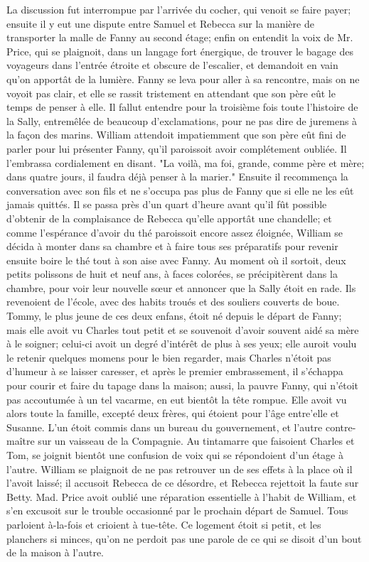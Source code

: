 La discussion fut interrompue par l'arrivée du cocher, qui venoit se faire payer; ensuite il y eut une dispute entre Samuel\setcounter{page}{386} et Rebecca sur la manière de transporter la malle de Fanny au second étage; enfin on entendit la voix de Mr. Price, qui se plaignoit, dans un langage fort énergique, de trouver le bagage des voyageurs dans l'entrée étroite et obscure de l'escalier, et demandoit en vain qu'on apportât de la lumière. Fanny se leva pour aller à sa rencontre, mais on ne voyoit pas clair, et elle se rassit tristement en attendant que son père eût le temps de penser à elle. Il fallut entendre pour la troisième fois toute l'histoire de la Sally, entremêlée de beaucoup d'exclamations, pour ne pas dire de juremens à la façon des marins. William attendoit impatiemment que son père eût fini de parler pour lui présenter Fanny, qu'il paroissoit avoir complétement oubliée. Il l'embrassa cordialement en disant. "La voilà, ma foi, grande, comme père et mère; dans quatre jours, il faudra déjà penser à la marier." Ensuite il recommença la conversation avec son fils et ne s'occupa pas plus de Fanny que si elle ne les eût jamais quittés.
Il se passa près d'un quart d'heure avant qu'il fût possible d'obtenir de la complaisance de Rebecca qu'elle apportât une chandelle; et comme l'espérance d'avoir du thé paroissoit encore assez éloignée, William se décida à monter dans\setcounter{page}{387} sa chambre et à faire tous ses préparatifs pour revenir ensuite boire le thé tout à son aise avec Fanny. Au moment où il sortoit, deux petits polissons de huit et neuf ans, à faces colorées, se précipitèrent dans la chambre, pour voir leur nouvelle sœur et annoncer que la Sally étoit en rade. Ils revenoient de l’école, avec des habits troués et des souliers couverts de boue. Tommy, le plus jeune de ces deux enfans, étoit né depuis le départ de Fanny; mais elle avoit vu Charles tout petit et se souvenoit d’avoir souvent aidé sa mère à le soigner; celui-ci avoit un degré d’intérêt de plus à ses yeux; elle auroit voulu le retenir quelques momens pour le bien regarder, mais Charles n’étoit pas d’humeur à se laisser caresser, et après le premier embrassement, il s’échappa pour courir et faire du tapage dans la maison; aussi, la pauvre Fanny, qui n’étoit pas accoutumée à un tel vacarme, en eut bientôt la tête rompue.
Elle avoit vu alors toute la famille, excepté deux frères, qui étoient pour l’âge entre’elle et Susanne. L’un étoit commis dans un bureau du gouvernement, et l’autre contre-maître sur un vaisseau de la Compagnie.
Au tintamarre que faisoient Charles et Tom, se joignit bientôt une confusion de\setcounter{page}{388} voix qui se répondoient d'un étage à l'autre. William se plaignoit de ne pas retrouver un de ses effets à la place où il l'avoit laissé; il accusoit Rebecca de ce désordre, et Rebecca rejettoit la faute sur Betty. Mad. Price avoit oublié une réparation essentielle à l'habit de William, et s'en excusoit sur le trouble occasionné par le prochain départ de Samuel. Tous parloient à-la-fois et crioient à tue-tête. Ce logement étoit si petit, et les planchers si minces, qu'on ne perdoit pas une parole de ce qui se disoit d'un bout de la maison à l'autre.
